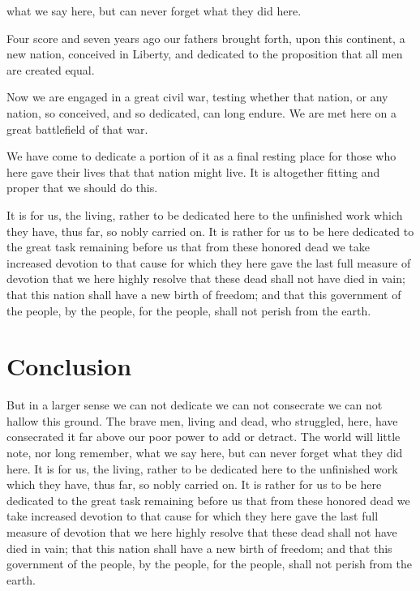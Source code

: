 \documentclass{roffin}
\begin{document}
what we say here, but can never forget what they did here.
\begin{bulletlist}
\item{}%
Four score and seven years ago our fathers brought forth,
upon this continent, a new nation, conceived in Liberty, and dedicated to
the proposition that all men are created equal.
\item{}%
Now we are engaged in a great civil war, testing whether that nation, or any nation, so conceived, and so dedicated, can long endure.
We are met here on a great battlefield of that war.
\item{}%
We have come to dedicate a portion of it as a final resting place for those who
here gave their lives that that nation might live. It is altogether fitting and proper that we should do this.
\end{bulletlist}
It is for us, the living, rather to be dedicated here to the unfinished work
which they have, thus far, so nobly carried on. It is rather for us to be here dedicated to the great task remaining before us that
from these honored dead we take increased devotion to that cause for which they here gave the last full measure of devotion that
we here highly resolve that these dead shall not have died in vain; that this nation shall have a new birth of freedom; and that this
government of the people, by the people, for the people, shall not perish from the earth.

\section{Conclusion}

But in a larger sense we can not dedicate we can not consecrate we can not hallow this ground. The brave men, living and dead,
who struggled, here, have consecrated it far above our poor power to add or detract. The world will little note, nor long remember,
what we say here, but can never forget what they did here. It is for us, the living, rather to be dedicated here to the unfinished work
which they have, thus far, so nobly carried on. It is rather for us to be here dedicated to the great task remaining before us that
from these honored dead we take increased devotion to that cause for which they here gave the last full measure of devotion that
we here highly resolve that these dead shall not have died in vain; that this nation shall have a new birth of freedom; and that this
government of the people, by the people, for the people, shall not perish from the earth.
\end{document}
